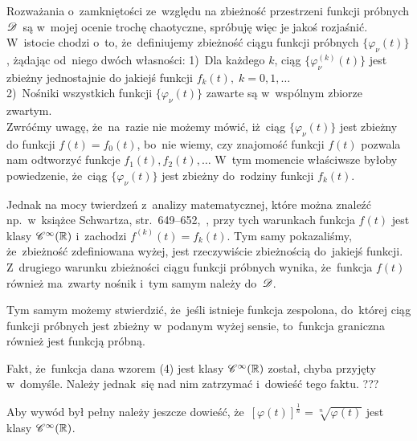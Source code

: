 \documentclass[a4paper,11pt]{article}
\begin{document}
\noindent
{} Rozważania o~zamkniętości ze~względu na zbieżność
przestrzeni funkcji próbnych $\mathcal{D}$~są w~mojej ocenie trochę
chaotyczne, spróbuję więc je jakoś rozjaśnić. W~istocie chodzi o~to,
że~definiujemy zbieżność ciągu funkcji próbnych
$\{ \varphi_{ \nu }( t ) \}$, żądając od~niego dwóch własności:
1)~Dla każdego $k$, ciąg $\{ \varphi_{ \nu }^{ ( k ) }( t ) \}$ jest
zbieżny jednostajnie do jakiejś funkcji
$f_{ k }( t ), \; k = 0, 1, \ldots$ \\
2)~Nośniki wszystkich funkcji $\{ \varphi_{ \nu }( t ) \}$ zawarte są
w~wspólnym zbiorze zwartym. \\
Zwróćmy uwagę, że~na~razie nie możemy mówić, iż~ciąg
$\{ \varphi_{ \nu }( t ) \}$ jest zbieżny do funkcji
$f( t ) = f_{ 0 }( t )$, bo~nie wiemy, czy znajomość funkcji $f( t )$
pozwala nam odtworzyć funkcje $f_{ 1 }( t ), f_{ 2 }( t ), \ldots$ W~tym
momencie właściwsze byłoby powiedzenie, że~ciąg
$\{ \varphi_{ \nu }( t ) \}$ jest zbieżny do~rodziny funkcji
$f_{ k }( t )$.

Jednak na mocy twierdzeń z~analizy matematycznej, które można znaleźć
np.~w~książce Schwartza, str.~649--652,~\cite{SchwartzKursAnalizyMatematycznejVolI1979}, przy tych
warunkach funkcja $f( t )$ jest klasy $\mathcal{C}^{ \infty }( \mathbb{R} )$ i~zachodzi
$f^{ ( k ) }( t ) = f_{ k }( t )$. Tym samy pokazaliśmy, że~zbieżność
zdefiniowana wyżej, jest rzeczywiście zbieżnością do~jakiejś funkcji.
Z~drugiego warunku zbieżności ciągu funkcji próbnych wynika,
że~funkcja $f( t )$ również ma~zwarty nośnik i~tym samym należy
do~$\mathcal{D}$.

Tym samym możemy stwierdzić, że~jeśli istnieje funkcja zespolona,
do~której ciąg funkcji próbnych jest zbieżny w~podanym wyżej sensie,
to~funkcja graniczna również jest funkcją próbną.

\VerSpaceFour





\noindent
{} Fakt, że~funkcja dana wzorem (4) jest klasy
$\mathcal{C}^{ \infty }( \mathbb{R} )$ został, chyba przyjęty w~domyśle. Należy jednak~się
nad nim zatrzymać i~dowieść tego faktu. ???

\VerSpaceFour





\noindent
{} Aby wywód był pełny należy jeszcze dowieść,
że~$[ \varphi( t ) ]^{ \frac{ 1 }{ n } } = \sqrt[ n ]{ \varphi( t ) }$ jest
klasy $\mathcal{C}^{ \infty }( \mathbb{R} )$.

\VerSpaceFour
\end{document}
